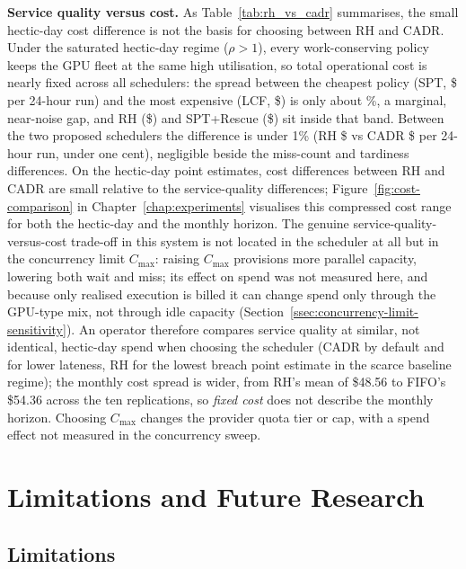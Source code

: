 {\textbf{Service quality versus cost.} As Table~\ref{tab:rh_vs_cadr} summarises, the small hectic-day cost difference is not the basis for choosing between RH and CADR. Under the saturated hectic-day regime ($\rho>1$), every work-conserving policy keeps the GPU fleet at the same high utilisation, so total operational cost is nearly fixed across all schedulers: the spread between the cheapest policy (SPT, \$\SPTcost{} per 24-hour run) and the most expensive (LCF, \$\LCFcost{}) is only about \CostSpreadPct\%, a marginal, near-noise gap, and RH (\$\RHcost{}) and SPT+Rescue (\$\RescueCost{}) sit inside that band. Between the two proposed schedulers the difference is under 1\% (RH \$\RHcost{} vs CADR \$\CADRcost{} per 24-hour run, under one cent), negligible beside the miss-count and tardiness differences. On the hectic-day point estimates, cost differences between RH and CADR are small relative to the service-quality differences; Figure~\ref{fig:cost-comparison} in Chapter~\ref{chap:experiments} visualises this compressed cost range for both the hectic-day and the monthly horizon. The genuine service-quality-versus-cost trade-off in this system is not located in the scheduler at all but in the concurrency limit $C_{\max}$: raising $C_{\max}$ provisions more parallel capacity, lowering both wait and miss; its effect on spend was not measured here, and because only realised execution is billed it can change spend only through the GPU-type mix, not through idle capacity (Section~\ref{ssec:concurrency-limit-sensitivity}). An operator therefore compares service quality at similar, not identical, hectic-day spend when choosing the scheduler (CADR by default and for lower lateness, RH for the lowest breach point estimate in the scarce baseline regime); the monthly cost spread is wider, from RH's mean of \$48.56 to FIFO's \$54.36 across the ten replications, so \emph{fixed cost} does not describe the monthly horizon. Choosing $C_{\max}$ changes the provider quota tier or cap, with a spend effect not measured in the concurrency sweep.

\section{Limitations and Future Research}
\label{sec:limitations-and-future-research}

\subsection{Limitations}
\label{ssec:limitations}

}
